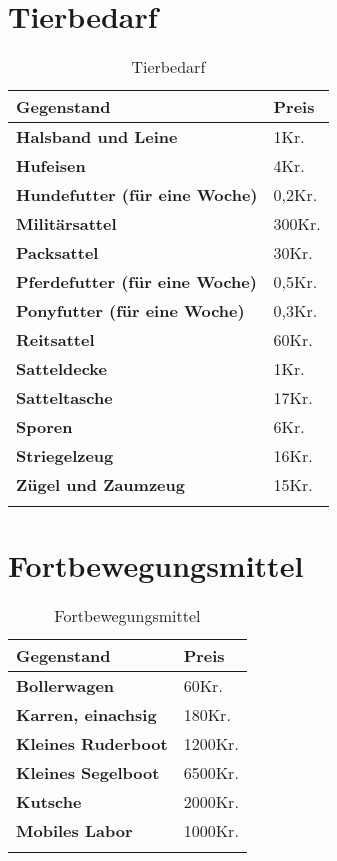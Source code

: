\section{Tierbedarf}
\begin{longtable}{|p{5cm}|p{2cm}|}
\hline
\textbf{Gegenstand} & \textbf{Preis} \\ \hline
\textbf{Halsband und Leine} & 1Kr. \\ \hline
\textbf{Hufeisen} & 4Kr. \\ \hline
\textbf{Hundefutter (für eine Woche)} & 0,2Kr. \\ \hline
\textbf{Militärsattel} & 300Kr. \\ \hline
\textbf{Packsattel} & 30Kr. \\ \hline
\textbf{Pferdefutter (für eine Woche)} & 0,5Kr. \\ \hline
\textbf{Ponyfutter (für eine Woche)} & 0,3Kr. \\ \hline
\textbf{Reitsattel} & 60Kr. \\ \hline
\textbf{Satteldecke} & 1Kr. \\ \hline
\textbf{Satteltasche} & 17Kr. \\ \hline
\textbf{Sporen} & 6Kr. \\ \hline
\textbf{Striegelzeug} & 16Kr. \\ \hline
\textbf{Zügel und Zaumzeug} & 15Kr. \\ \hline

\caption{Tierbedarf}
\label{tab:Tierbedarf}
\end{longtable}


\section{Fortbewegungsmittel}
\begin{longtable}{|p{5cm}|p{2cm}|}
\hline
\textbf{Gegenstand} & \textbf{Preis} \\ \hline
\textbf{Bollerwagen} & 60Kr. \\ \hline
\textbf{Karren, einachsig} & 180Kr. \\ \hline
\textbf{Kleines Ruderboot} & 1200Kr. \\ \hline
\textbf{Kleines Segelboot} & 6500Kr. \\ \hline
\textbf{Kutsche} & 2000Kr. \\ \hline
\textbf{Mobiles Labor} & 1000Kr. \\ \hline

\caption{Fortbewegungsmittel}
\label{tab:Fortbewegungsmittel}
\end{longtable}


